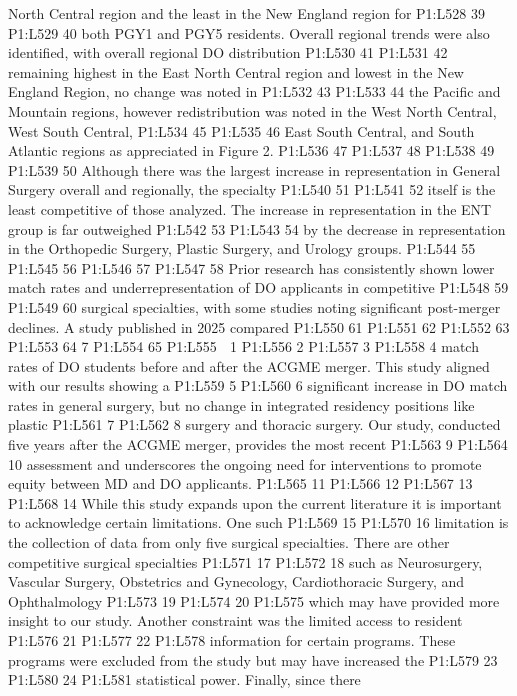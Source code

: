 North Central region and the least in the New England region for P1:L528
39 P1:L529 40 both PGY1 and PGY5 residents. Overall regional trends were
also identified, with overall regional DO distribution P1:L530 41
P1:L531 42 remaining highest in the East North Central region and lowest
in the New England Region, no change was noted in P1:L532 43 P1:L533 44
the Pacific and Mountain regions, however redistribution was noted in
the West North Central, West South Central, P1:L534 45 P1:L535 46 East
South Central, and South Atlantic regions as appreciated in Figure 2.
P1:L536 47 P1:L537 48 P1:L538 49 P1:L539 50 Although there was the
largest increase in representation in General Surgery overall and
regionally, the specialty P1:L540 51 P1:L541 52 itself is the least
competitive of those analyzed. The increase in representation in the ENT
group is far outweighed P1:L542 53 P1:L543 54 by the decrease in
representation in the Orthopedic Surgery, Plastic Surgery, and Urology
groups. P1:L544 55 P1:L545 56 P1:L546 57 P1:L547 58 Prior research has
consistently shown lower match rates and underrepresentation of DO
applicants in competitive P1:L548 59 P1:L549 60 surgical specialties,
with some studies noting significant post-merger declines. A study
published in 2025 compared P1:L550 61 P1:L551 62 P1:L552 63 P1:L553 64 7
P1:L554 65 P1:L555  1 P1:L556 2 P1:L557 3 P1:L558 4 match rates of DO
students before and after the ACGME merger. This study aligned with our
results showing a P1:L559 5 P1:L560 6 significant increase in DO match
rates in general surgery, but no change in integrated residency
positions like plastic P1:L561 7 P1:L562 8 surgery and thoracic surgery.
Our study, conducted five years after the ACGME merger, provides the
most recent P1:L563 9 P1:L564 10 assessment and underscores the ongoing
need for interventions to promote equity between MD and DO applicants.
P1:L565 11 P1:L566 12 P1:L567 13 P1:L568 14 While this study expands
upon the current literature it is important to acknowledge certain
limitations. One such P1:L569 15 P1:L570 16 limitation is the collection
of data from only five surgical specialties. There are other competitive
surgical specialties P1:L571 17 P1:L572 18 such as Neurosurgery,
Vascular Surgery, Obstetrics and Gynecology, Cardiothoracic Surgery, and
Ophthalmology P1:L573 19 P1:L574 20 P1:L575 which may have provided more
insight to our study. Another constraint was the limited access to
resident P1:L576 21 P1:L577 22 P1:L578 information for certain programs.
These programs were excluded from the study but may have increased the
P1:L579 23 P1:L580 24 P1:L581 statistical power. Finally, since there
